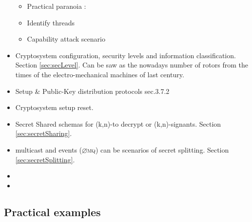 \documentclass[10pt,a4paper,twoside]{llncs}
\newcommand{\zmq}{\textsc{$\varnothing$mq}}
\begin{document}
\begin{itemize}
\begin{itemize}
        \item Practical paranoia \cite{PractCryptoSchneier}:
        \item Identify threads
        \item Capability attack scenario
    \end{itemize}
    \item Cryptosystem configuration, security levels and information classification. Section \ref{sec:secLevel}. Can be saw as the nowadays number of rotors from the times of the electro-mechanical machines of last century.
    \item Setup \& Public-Key distribution protocols \cite{SecEngRossAnderson} sec.3.7.2
    \item Cryptosystem setup reset.
    \item Secret Shared schemas for (k,n)-to decrypt or (k,n)-signants. Section \ref{sec:secretSharing}.
    \item multicast and events (\zmq) can be scenarios of secret splitting. Section \ref{sec:secretSplitting}.
    \item 
    \item 
\end{itemize}


\subsection{Practical examples \label{sec:practExamples}}
\end{document}
